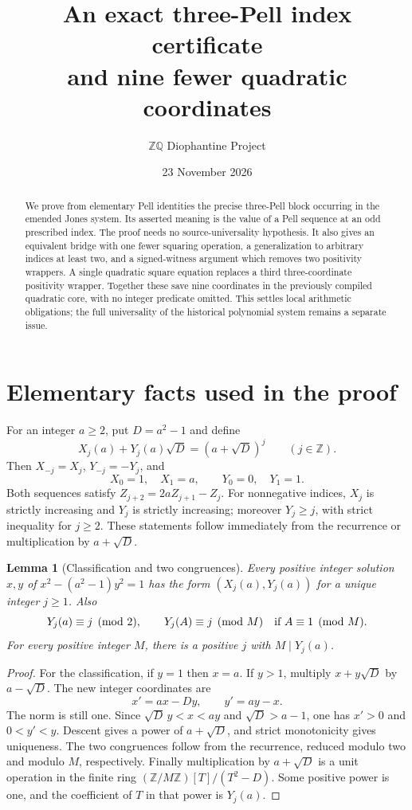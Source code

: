 \documentclass[11pt]{article}
\title{An exact three-Pell index certificate\\and nine fewer quadratic coordinates}
\author{\(\mathbb Z\mathbb Q\) Diophantine Project}
\date{23 November 2026}
\newtheorem{lemma}[theorem]{Lemma}
\newcommand{\Z}{\mathbb Z}\newcommand{\N}{\mathbb Z_{\ge0}}
\begin{document}
\maketitle
\begin{abstract}
We prove from elementary Pell identities the precise three-Pell block
occurring in the emended Jones system.  Its asserted meaning is the
value of a Pell sequence at an odd prescribed index.  The proof needs
no source-universality hypothesis.  It also gives an equivalent bridge
with one fewer squaring operation, a generalization to arbitrary
indices at least two, and a signed-witness argument which removes
two positivity wrappers.  A single quadratic square equation replaces
a third three-coordinate positivity wrapper.  Together these save
nine coordinates in the previously compiled quadratic core, with no
integer predicate omitted.  This settles local arithmetic obligations;
the full universality of the historical polynomial system remains a
separate issue.
\end{abstract}

\section{Elementary facts used in the proof}

For an integer \(a\ge2\), put \(D=a^2-1\) and define
\[
 X_j(a)+Y_j(a)\sqrt D=(a+\sqrt D)^j \qquad(j\in\Z).
\]
Then \(X_{-j}=X_j\), \(Y_{-j}=-Y_j\), and
\[
 X_0=1,\quad X_1=a,\qquad Y_0=0,\quad Y_1=1.
\]
Both sequences satisfy \(Z_{j+2}=2aZ_{j+1}-Z_j\).
For nonnegative indices, \(X_j\) is strictly increasing and \(Y_j\)
is strictly increasing; moreover \(Y_j\ge j\), with strict inequality
for \(j\ge2\).  These statements follow immediately from the recurrence
or multiplication by \(a+\sqrt D\).

\begin{lemma}[Classification and two congruences]\label{classification}
Every positive integer solution \(x,y\) of
\(x^2-(a^2-1)y^2=1\) has the form \((X_j(a),Y_j(a))\) for a unique
integer \(j\ge1\).  Also
\[
 Y_j(a)\equiv j\pmod2,
 \qquad Y_j(A)\equiv j\pmod M \quad\hbox{if } A\equiv1\pmod M.
\]
For every positive integer \(M\), there is a positive \(j\) with
\(M\mid Y_j(a)\).
\end{lemma}
\begin{proof}
For the classification, if \(y=1\) then \(x=a\).  If \(y>1\),
multiply \(x+y\sqrt D\) by \(a-\sqrt D\).  The new integer
coordinates are
\[
             x'=ax-Dy,\qquad y'=ay-x.
\]
The norm is still one.  Since
\(\sqrt D\,y<x<ay\) and \(\sqrt D>a-1\), one has
\(x'>0\) and \(0<y'<y\).  Descent gives a power of
\(a+\sqrt D\), and strict monotonicity gives uniqueness.
The two congruences follow from the recurrence, reduced modulo two
and modulo \(M\), respectively.  Finally multiplication by
\(a+\sqrt D\) is a unit operation in the finite ring
\((\Z/M\Z)[T]/(T^2-D)\).  Some positive power is one, and
the coefficient of \(T\) in that power is \(Y_j(a)\).
\end{proof}
\end{document}
